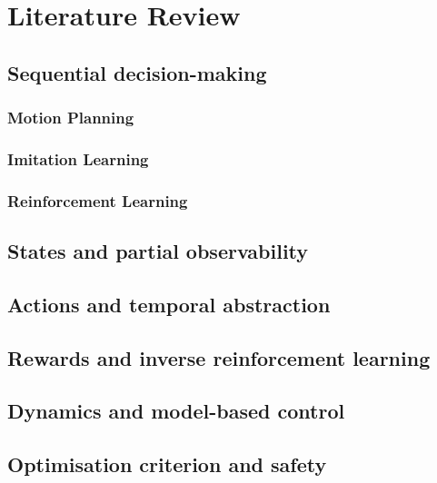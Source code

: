 
\chapter{Literature Review}
\label{chapter:2}

\section{Sequential decision-making}
\subsection{Motion Planning}
\subsection{Imitation Learning}
\subsection{Reinforcement Learning}
\section{States and partial observability}
\section{Actions and temporal abstraction}
\section{Rewards and inverse reinforcement learning}
\section{Dynamics and model-based control}
\section{Optimisation criterion and safety}